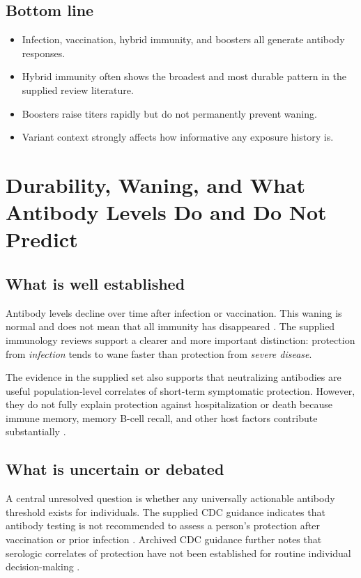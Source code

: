 \documentclass[12pt]{article}
\begin{document}
\subsection*{Bottom line}
\begin{itemize}[leftmargin=1.5em]
    \item Infection, vaccination, hybrid immunity, and boosters all generate antibody responses.
    \item Hybrid immunity often shows the broadest and most durable pattern in the supplied review literature.
    \item Boosters raise titers rapidly but do not permanently prevent waning.
    \item Variant context strongly affects how informative any exposure history is.
\end{itemize}

\section{Durability, Waning, and What Antibody Levels Do and Do Not Predict}
\subsection*{What is well established}
Antibody levels decline over time after infection or vaccination. This waning is normal and does not mean that all immunity has disappeared \cite{ref3,ref5}. The supplied immunology reviews support a clearer and more important distinction: protection from \emph{infection} tends to wane faster than protection from \emph{severe disease}.

The evidence in the supplied set also supports that neutralizing antibodies are useful population-level correlates of short-term symptomatic protection. However, they do not fully explain protection against hospitalization or death because immune memory, memory B-cell recall, and other host factors contribute substantially \cite{ref3,ref4,ref5}.

\subsection*{What is uncertain or debated}
A central unresolved question is whether any universally actionable antibody threshold exists for individuals. The supplied CDC guidance indicates that antibody testing is not recommended to assess a person's protection after vaccination or prior infection \cite{ref1}. Archived CDC guidance further notes that serologic correlates of protection have not been established for routine individual decision-making \cite{ref8}.
\end{document}
